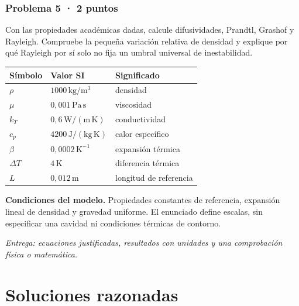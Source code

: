 \par\medskip\noindent\begin{minipage}{\linewidth}

\section{Problema 5 · 2 puntos}

Con las propiedades académicas dadas, calcule difusividades, Prandtl, Grashof y Rayleigh. Compruebe la pequeña variación relativa de densidad y explique por qué Rayleigh por sí solo no fija un umbral universal de inestabilidad.

\begin{tabular}{@{}p{.15\linewidth}p{.23\linewidth}p{.54\linewidth}@{}}
\toprule Símbolo & Valor SI & Significado\\\midrule
$\rho$ & $1000\,\mathrm{kg/m^3}$ & densidad\\
$\mu$ & $0{,}001\,\mathrm{Pa\,s}$ & viscosidad\\
$k_T$ & $0{,}6\,\mathrm{W/(m\,K)}$ & conductividad\\
$c_p$ & $4200\,\mathrm{J/(kg\,K)}$ & calor específico\\
$\beta$ & $0{,}0002\,\mathrm{K^{-1}}$ & expansión térmica\\
$\Delta T$ & $4\,\mathrm{K}$ & diferencia térmica\\
$L$ & $0{,}012\,\mathrm{m}$ & longitud de referencia\\
\bottomrule\end{tabular}

\par\medskip\textbf{Condiciones del modelo.} Propiedades constantes de referencia, expansión lineal de densidad y gravedad uniforme. El enunciado define escalas, sin especificar una cavidad ni condiciones térmicas de contorno.

\par\textit{Entrega: ecuaciones justificadas, resultados con unidades y una comprobación física o matemática.}

\end{minipage}\par\medskip


\part{Soluciones razonadas}

